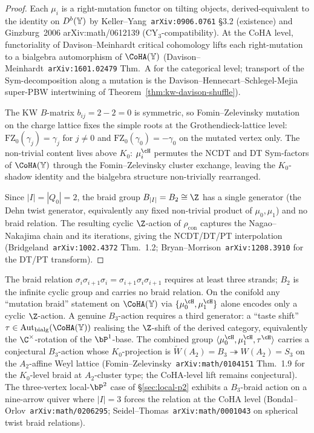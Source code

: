 \begin{proof}
Each $\mu_i$ is a right-mutation functor on tilting objects, derived-equivalent to the identity on $D^b(\mathbb{Y})$ by Keller--Yang~\texttt{arXiv:0906.0761} \S3.2 (existence) and Ginzburg~2006 arXiv:math/0612139 (CY$_3$-compatibility). At the CoHA level, functoriality of Davison--Meinhardt critical cohomology lifts each right-mutation to a bialgebra automorphism of $\CoHA(\bY)$ (Davison--Meinhardt~\texttt{arXiv:1601.02479} Thm.~A for the categorical level; transport of the Sym-decomposition along a mutation is the Davison--Hennecart--Schlegel-Mejia super-PBW intertwining of Theorem~\ref{thm:kw-davison-shuffle}).

The KW $B$-matrix $b_{ij} = 2 - 2 = 0$ is symmetric, so Fomin--Zelevinsky mutation on the charge lattice fixes the simple roots at the Grothendieck-lattice level: $\mathrm{FZ}_0(\gamma_j) = \gamma_j$ for $j \neq 0$ and $\mathrm{FZ}_0(\gamma_0) = -\gamma_0$ on the mutated vertex only. The non-trivial content lives above $K_0$: $\mu_i^{\cH}$ permutes the NCDT and DT Sym-factors of $\CoHA(\bY)$ through the Fomin--Zelevinsky cluster exchange, leaving the $K_0$-shadow identity and the bialgebra structure non-trivially rearranged.

Since $|I| = |Q_0| = 2$, the braid group $B_{|I|} = B_2 \cong \Z$ has a single generator (the Dehn twist generator, equivalently any fixed non-trivial product of $\mu_0, \mu_1$) and no braid relation. The resulting cyclic $\Z$-action of $\rho_{\mathrm{con}}$ captures the Nagao--Nakajima chain and its iterations, giving the NCDT/DT/PT interpolation (Bridgeland~\texttt{arXiv:1002.4372} Thm.~1.2; Bryan--Morrison~\texttt{arXiv:1208.3910} for the DT/PT transform).
\end{proof}

\begin{remark}
\label{rem:kw-braid-needs-three}
The braid relation $\sigma_i \sigma_{i+1} \sigma_i = \sigma_{i+1} \sigma_i \sigma_{i+1}$ requires at least three strands; $B_2$ is the infinite cyclic group and carries no braid relation. On the conifold any ``mutation braid'' statement on $\CoHA(\bY)$ via $\{\mu_0^{\cH}, \mu_1^{\cH}\}$ alone encodes only a cyclic $\Z$-action. A genuine $B_3$-action requires a third generator: a ``taste shift'' $\tau \in \mathrm{Aut}_{\mathrm{bialg}}(\CoHA(\bY))$ realising the $\Z$-shift of the derived category, equivalently the $\C^\times$-rotation of the $\bP^1$-base. The combined group $\langle \mu_0^{\cH}, \mu_1^{\cH}, \tau^{\cH}\rangle$ carries a conjectural $B_3$-action whose $K_0$-projection is $\widetilde{W}(A_2) = B_3 \twoheadrightarrow W(A_2) = S_3$ on the $A_2$-affine Weyl lattice (Fomin--Zelevinsky~\texttt{arXiv:math/0104151} Thm.~1.9 for the $K_0$-level braid at $A_2$-cluster type; the CoHA-level lift remains conjectural). The three-vertex local-$\bP^2$ case of \S\ref{sec:local-p2} exhibits a $B_3$-braid action on a nine-arrow quiver where $|I| = 3$ forces the relation at the CoHA level (Bondal--Orlov~\texttt{arXiv:math/0206295}; Seidel--Thomas~\texttt{arXiv:math/0001043} on spherical twist braid relations).
\end{remark}

